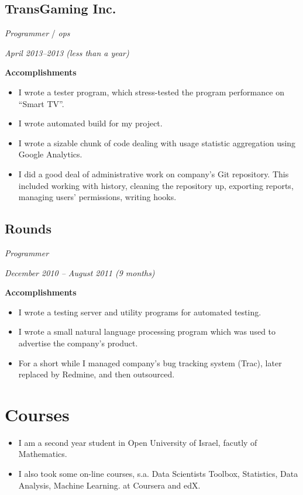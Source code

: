\documentclass[11pt]{article}
\begin{document}
\subsection{TransGaming Inc.}
\label{sec:orgheadline10}
\begin{description}
\item[{Position}] \emph{Programmer} / \emph{ops}
\item[{Term}] \emph{April 2013--2013 (less than a year)}
\item \textbf{Accomplishments}
\begin{itemize}
\item I wrote a tester program, which stress-tested the program performance
on ``Smart TV''.
\item I wrote automated build for my project.
\item I wrote a sizable chunk of code dealing with usage statistic aggregation
using Google Analytics.
\item I did a good deal of administrative work on company's Git repository.
This included working with history, cleaning the repository up, exporting
reports, managing users' permissions, writing hooks.
\end{itemize}
\end{description}

\subsection{Rounds}
\label{sec:orgheadline11}
\begin{description}
\item[{Position}] \emph{Programmer}
\item[{Term}] \emph{December 2010 – August 2011 (9 months)}
\item \textbf{Accomplishments}
\begin{itemize}
\item I wrote a testing server and utility programs for automated testing.
\item I wrote a small natural language processing program which was used
to advertise the company's product.
\item For a short while I managed company's bug tracking system (Trac),
later replaced by Redmine, and then outsourced.
\end{itemize}
\end{description}

\section{Courses}
\label{sec:orgheadline13}
\begin{itemize}
\item I am a second year student in Open University of Israel, facutly of
Mathematics.
\item I also took some on-line courses, s.a. Data Scientists Toolbox, Statistics,
Data Analysis, Machine Learning. at Coursera and edX.
\end{itemize}
\end{document}
